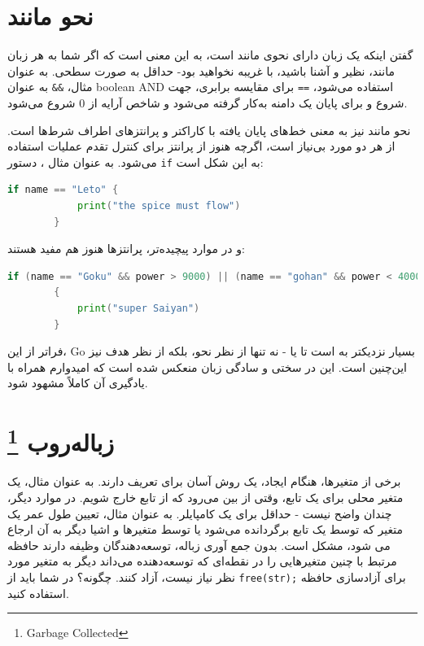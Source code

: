 \documentclass{book}
\begin{document}
\section{ نحو  مانند}
گفتن اینکه یک زبان دارای نحوی  مانند است، به این معنی است که اگر شما به هر زبان  مانند، نظیر 
 و  آشنا باشید، با  غریبه نخواهید بود- حداقل به صورت سطحی. به عنوان مثال، \verb*|&&| به عنوان boolean AND استفاده می‌شود، \verb*|==| برای مقایسه برابری،
 \lr{\{}
جهت شروع و
 \lr{\}}
 برای پایان یک دامنه به‌کار گرفته می‌شود و شاخص‌ آرایه از 0 شروع می‌شود.
 
 نحو  مانند نیز به معنی خط‌های  پایان یافته با کاراکتر \lr{;} و پرانتزهای اطراف شرط‌ها است.  از هر دو مورد بی‌نیاز است، اگرچه هنوز از پرانتز برای کنترل تقدم عملیات استفاده می‌شود.
 به عنوان مثال ، دستور \verb*|if| به این شکل است:
 
 \begin{latin}
 	\begin{lstlisting}[language=Go]
 		if name == "Leto" {
 			print("the spice must flow")
 		}
 	\end{lstlisting}
 \end{latin}
و در موارد پیچیده‌تر، پرانتزها هنوز هم مفید هستند:

\begin{latin}
	\begin{lstlisting}[language=Go]
		if (name == "Goku" && power > 9000) || (name == "gohan" && power < 4000)
		{
			print("super Saiyan")
		}
	\end{lstlisting}
\end{latin}

فراتر از این، Go بسیار نزدیکتر  به  است تا  یا - نه تنها از نظر نحو، بلکه از نظر هدف نیز این‌چنین است. این
در سختی و سادگی زبان منعکس شده است که امیدوارم همراه با یادگیری آن کاملاً مشهود شود.
\newpage
\section{زباله‌روب
\footnote{Garbage Collected}}
برخی از متغیرها، هنگام ایجاد، یک روش آسان برای تعریف دارند. به عنوان مثال، یک  متغیر محلی برای یک تابع، وقتی از بین می‌رود
که از تابع خارج شویم. در موارد دیگر، چندان واضح نیست - حداقل برای یک کامپایلر. به عنوان مثال، تعیین طول عمر یک متغیر که توسط یک تابع برگردانده می‌شود یا توسط متغیرها و اشیا دیگر به آن ارجاع می شود، مشکل است. بدون جمع آوری زباله، توسعه‌دهندگان وظیفه دارند حافظه مرتبط با چنین متغیرهایی را در نقطه‌ای که توسعه‌دهنده می‌داند دیگر به متغیر مورد نظر نیاز نیست، آزاد کنند. چگونه؟ در  شما باید از
\verb*|free(str);|
برای آزادسازی حافظه استفاده کنید.
\end{document}
